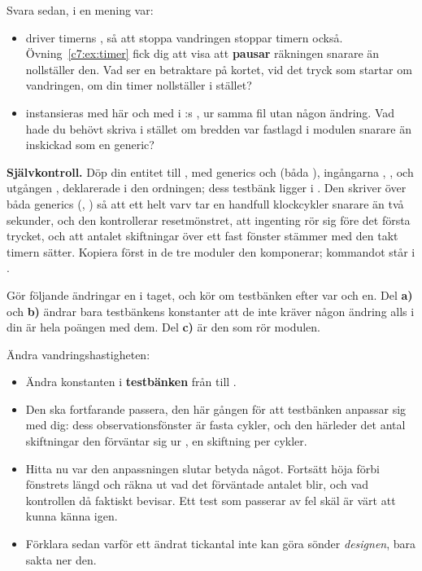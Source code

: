 Svara sedan, i en mening var:
\begin{itemize}
  \item {} driver timerns , så att stoppa vandringen stoppar timern
    också. Övning~\ref{c7:ex:timer} fick dig att visa att  \textbf{pausar} räkningen
    snarare än nollställer den. Vad ser en betraktare på kortet, vid det tryck som startar om
    vandringen, om din timer nollställer i stället?
  \item {} instansieras med  här och med  i
    :s , ur samma fil utan någon ändring. Vad hade du behövt skriva i
    stället om bredden var fastlagd i modulen snarare än inskickad som en generic?
\end{itemize}


\begin{selfcheck}
\textbf{Självkontroll.} Döp din entitet till , med generics  och
 (båda ), ingångarna , , 
och utgången , deklarerade i den ordningen; dess testbänk ligger i
. Den skriver över båda generics (,
) så att ett helt varv tar en handfull klockcykler snarare än två sekunder, och
den kontrollerar resetmönstret, att ingenting rör sig före det första trycket, och att antalet
skiftningar över ett fast fönster stämmer med den takt timern sätter. Kopiera först in de tre
moduler den komponerar; kommandot står i .
\end{selfcheck}

\label{c7:ex:variants}
Gör följande ändringar en i taget, och kör om testbänken efter var och en. Del \textbf{a)} och
\textbf{b)} ändrar bara testbänkens konstanter \textemdash{} att de inte kräver någon ändring alls i
din  är hela poängen med dem. Del \textbf{c)} är den som rör modulen.

 Ändra vandringshastigheten:
\begin{itemize}
  \item Ändra konstanten  i \textbf{testbänken} från  till .
  \item Den ska fortfarande passera, den här gången för att testbänken anpassar sig med dig: dess
    observationsfönster är fasta  cykler, och den härleder det antal skiftningar
    den förväntar sig ur , en skiftning per  cykler.
  \item Hitta nu var den anpassningen slutar betyda något. Fortsätt höja  förbi
    fönstrets längd och räkna ut vad det förväntade antalet blir, och vad kontrollen då faktiskt
    bevisar. Ett test som passerar av fel skäl är värt att kunna känna igen.
  \item Förklara sedan varför ett ändrat tickantal inte kan göra sönder \emph{designen}, bara sakta
    ner den.
\end{itemize}

